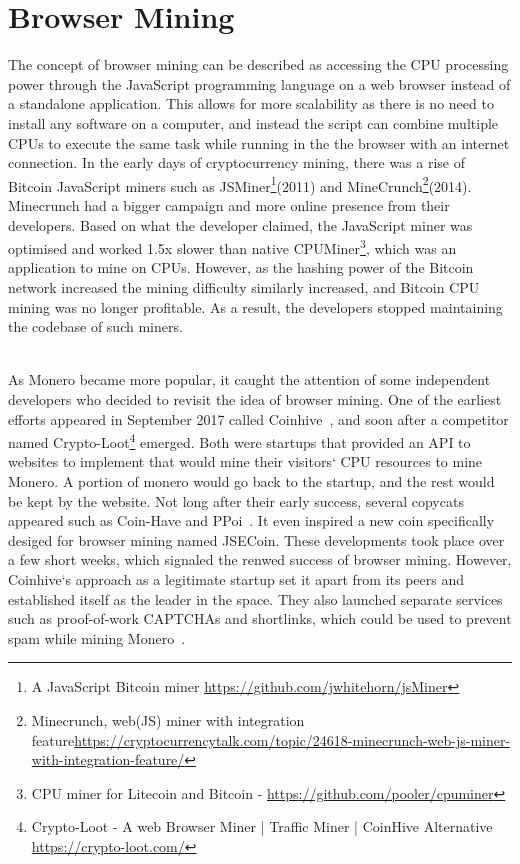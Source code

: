 

\section{Browser Mining}
The concept of browser mining can be described as accessing the CPU processing power through the JavaScript programming language on a web browser instead of a standalone application. This allows for more scalability as there is no need to install any software on a computer, and instead the script can combine multiple CPUs to execute the same task while running in the the browser with an internet connection. In the early days of cryptocurrency mining, there was a rise of Bitcoin JavaScript miners such as JSMiner\footnote{A JavaScript Bitcoin miner \url{https://github.com/jwhitehorn/jsMiner}}(2011) and MineCrunch\footnote{Minecrunch, web(JS) miner with integration feature\url{https://cryptocurrencytalk.com/topic/24618-minecrunch-web-js-miner-with-integration-feature/}}(2014). Minecrunch had a bigger campaign and more online presence from their developers. Based on what the developer claimed, the JavaScript miner was optimised and worked 1.5x slower than native CPUMiner\footnote{CPU miner for Litecoin and Bitcoin - \url{https://github.com/pooler/cpuminer}}, which was an application to mine on CPUs. However, as the hashing power of the Bitcoin network increased the mining difficulty similarly increased, and Bitcoin CPU mining was no longer profitable. As a result, the developers stopped maintaining the codebase of such miners.

\\

As Monero became more popular, it caught the attention of some independent developers who decided to revisit the idea of browser mining. One of the earliest efforts appeared in September 2017 called Coinhive~\cite{coinhive}, and soon after a competitor named Crypto-Loot\footnote{Crypto-Loot - A web Browser Miner | Traffic Miner | CoinHive Alternative \url{https://crypto-loot.com/}} emerged. Both were startups that provided an API to websites to implement that would mine their visitors` CPU resources to mine Monero. A portion of monero would go back to the startup, and the rest would be kept by the website. Not long after their early success, several copycats appeared such as Coin-Have and PPoi~\cite{coinhivecopycats}. It even inspired a new coin specifically desiged for browser mining named JSECoin. These developments took place over a few short weeks, which signaled the renwed success of browser mining. However, Coinhive`s approach as a legitimate startup set it apart from its peers and established itself as the leader in the space. They also launched separate services such as proof-of-work CAPTCHAs and shortlinks, which could be used to prevent spam while mining Monero~\cite{coinhive}.

